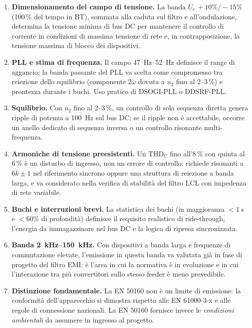 \documentclass[11pt,a4paper]{article}
\newcommand{\Uc}{U_{\mathrm{c}}}
\begin{document}
\begin{enumerate}[itemsep=3pt]
  \item \textbf{Dimensionamento del campo di tensione.} La banda
        $\Uc\,+10\%/-15\%$ (100\,\% del tempo in BT), sommata alla caduta sul filtro
        e all'ondulazione, determina la tensione minima di bus DC per mantenere il
        controllo di corrente in condizioni di massima tensione di rete e, in
        contrapposizione, la tensione massima di blocco dei dispositivi.
  \item \textbf{PLL e stima di frequenza.} Il campo \SIrange{47}{52}{Hz} definisce il
        range di aggancio; la banda passante del PLL va scelta come compromesso tra
        reiezione dello squilibrio (componente $2\omega$ dovuta a $u_2$ fino al 2--3\,\%)
        e prontezza durante i buchi. Uso pratico di DSOGI-PLL o DDSRF-PLL.
  \item \textbf{Squilibrio.} Con $u_2$ fino al 2--3\,\%, un controllo di sola sequenza
        diretta genera ripple di potenza a \SI{100}{Hz} sul bus DC; se il ripple non
        è accettabile, occorre un anello dedicato di sequenza inversa o un controllo
        risonante multi-frequenza.
  \item \textbf{Armoniche di tensione preesistenti.} Un $\mathrm{THD}_U$ fino all'8\,\%
        con quinta al 6\,\% è un disturbo di ingresso, non un errore di controllo:
        richiede risonanti a $6k\pm1$ nel riferimento sincrono oppure una struttura
        di reiezione a banda larga, e va considerato nella verifica di stabilità
        del filtro LCL con impedenza di rete variabile.
  \item \textbf{Buchi e interruzioni brevi.} La statistica dei buchi
        (in maggioranza $<\SI{1}{\second}$ e $<60\%$ di profondità) definisce il
        requisito realistico di ride-through, l'energia da immagazzinare nel bus DC
        e la logica di ripresa sincronizzata.
  \item \textbf{Banda \SIrange{2}{150}{kHz}.} Con dispositivi a banda larga e frequenze
        di commutazione elevate, l'emissione in questa banda va valutata già in fase
        di progetto del filtro EMI: è l'area in cui la normativa è in evoluzione e in
        cui l'interazione tra più convertitori sullo stesso feeder è meno prevedibile.
  \item \textbf{Distinzione fondamentale.} La EN 50160 non è un limite di emissione:
        la conformità dell'apparecchio si dimostra rispetto alle EN 61000-3-x e alle
        regole di connessione nazionali. La EN 50160 fornisce invece le
        \emph{condizioni ambientali} da assumere in ingresso al progetto.
\end{enumerate}
\end{document}
